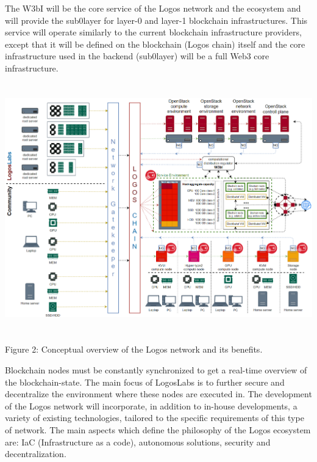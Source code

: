 \documentclass[]{article}
\begin{document}
The W3bI will be the core service of the Logos network and the ecosystem and will provide the sub0layer for layer-0 and layer-1 blockchain infrastructures.
This service will operate similarly to the current blockchain infrastructure providers, except that it will be defined on the blockchain (Logos chain) itself and the core infrastructure used in the backend (sub0layer) will be a full Web3 core infrastructure.

\begin{center}
	\includegraphics[height=10.8cm]{logos-network}
\end{center}
\begin{center}
	Figure 2: Conceptual overview of the Logos network and its benefits.
\end{center}

Blockchain nodes must be constantly synchronized to get a real-time overview of the blockchain-state.
The main focus of LogosLabs is to further secure and decentralize the environment where these nodes are executed in.
The development of the Logos network will incorporate, in addition to in-house developments, a variety of existing technologies, tailored to the specific requirements of this type of network.
The main aspects which define the philosophy of the Logos ecosystem are: IaC (Infrastructure as a code), autonomous solutions, security and decentralization.

\end{document}
